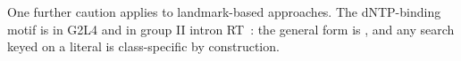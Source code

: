 One further caution applies to landmark-based approaches. The dNTP-binding motif is
 in G2L4 and  in group II intron RT~\cite{yang2025}: the general form
is , and any search keyed on a literal  is class-specific by
construction.




